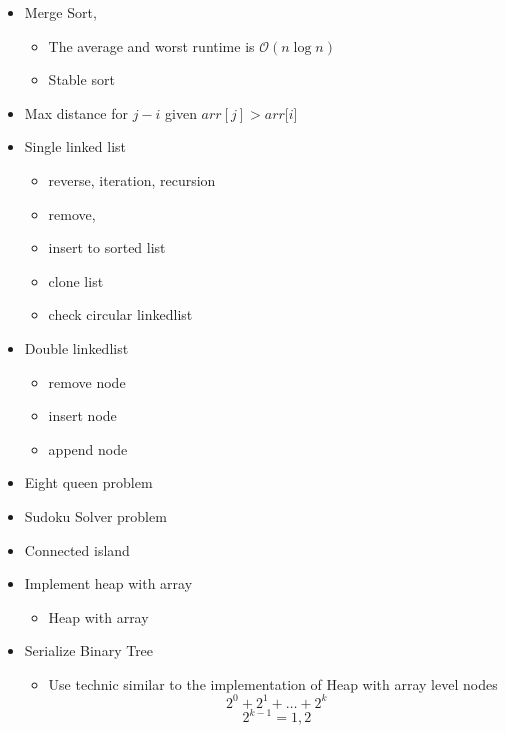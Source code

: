 \documentclass{article}
\begin{document}
\begin{enumerate}
\begin{itemize}
\begin{itemize}
    \item Merge Sort, 
        \begin{itemize}
        \item The average and worst runtime is $\mathcal{O}(n\log{}n)$ 
        \item Stable sort
        \end{itemize} 
    \item Max distance for $j - i$ given $arr[j] > arr[i$] 
    \item Single linked list
    \begin{itemize}
        \item reverse, iteration, recursion
        \item remove, 
        \item insert to sorted list 
        \item clone list
        \item check circular linkedlist 
    \end{itemize} 
    \item Double linkedlist
        \begin{itemize}
            \item remove node
            \item insert node
            \item append node
        \end{itemize} 
    \item Eight queen problem
    \item Sudoku Solver problem
    \item Connected island 
    \item Implement heap with array
    \begin{itemize}
     \item Heap with array \\ 
    \end{itemize}

    \pagebreak
    \item Serialize Binary Tree 
        \begin{itemize}
        \item Use technic similar to the implementation of Heap with array  
            level nodes \\ 
            \[ 2^0 + 2^1 + \dots + 2^k \]
            \[ 2^{k-1}  = 1, 2\]


\end{itemize}
\end{itemize}
\end{itemize}
\end{enumerate}
\end{document}
